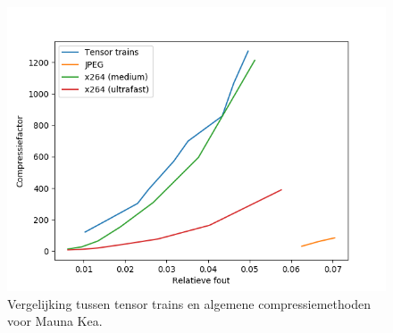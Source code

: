 \begin{figure}[H]
  \centering
  \includegraphics[scale=0.7]{images/general_comparison_Mauna_Kea.png}
  \caption{Vergelijking tussen tensor trains en algemene compressiemethoden voor Mauna Kea.}
\label{fig:general-comparison-mauna-kea}
\end{figure}

